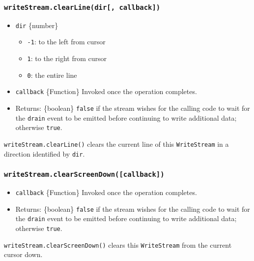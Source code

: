 \subsubsection{\texorpdfstring{\texttt{writeStream.clearLine(dir{[},\ callback{]})}}{writeStream.clearLine(dir{[}, callback{]})}}\label{writestream.clearlinedir-callback}

\begin{itemize}
\tightlist
\item
  \texttt{dir} \{number\}

  \begin{itemize}
  \tightlist
  \item
    \texttt{-1}: to the left from cursor
  \item
    \texttt{1}: to the right from cursor
  \item
    \texttt{0}: the entire line
  \end{itemize}
\item
  \texttt{callback} \{Function\} Invoked once the operation completes.
\item
  Returns: \{boolean\} \texttt{false} if the stream wishes for the
  calling code to wait for the
  \texttt{\textquotesingle{}drain\textquotesingle{}} event to be emitted
  before continuing to write additional data; otherwise \texttt{true}.
\end{itemize}

\texttt{writeStream.clearLine()} clears the current line of this
\texttt{WriteStream} in a direction identified by \texttt{dir}.

\subsubsection{\texorpdfstring{\texttt{writeStream.clearScreenDown({[}callback{]})}}{writeStream.clearScreenDown({[}callback{]})}}\label{writestream.clearscreendowncallback}

\begin{itemize}
\tightlist
\item
  \texttt{callback} \{Function\} Invoked once the operation completes.
\item
  Returns: \{boolean\} \texttt{false} if the stream wishes for the
  calling code to wait for the
  \texttt{\textquotesingle{}drain\textquotesingle{}} event to be emitted
  before continuing to write additional data; otherwise \texttt{true}.
\end{itemize}

\texttt{writeStream.clearScreenDown()} clears this \texttt{WriteStream}
from the current cursor down.

